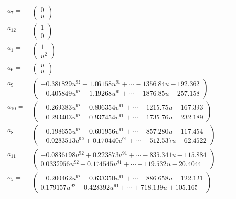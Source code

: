\documentclass[1p]{elsarticle_modified}
\theoremstyle{definition}
\begin{document}
\begin{tabular}{m{7pt} m{180pt} m{7pt} m{180pt} }
\flushright $a_{7}=$&$\begin{pmatrix}0\\u\end{pmatrix}$ \\
\flushright $a_{12}=$&$\begin{pmatrix}1\\0\end{pmatrix}$ \\
\flushright $a_{1}=$&$\begin{pmatrix}1\\u^2\end{pmatrix}$ \\
\flushright $a_{6}=$&$\begin{pmatrix}u\\u\end{pmatrix}$ \\
\flushright $a_{9}=$&$\begin{pmatrix}-0.381829 u^{92}+1.06158 u^{91}+\cdots-1356.84 u-192.362\\-0.405849 u^{92}+1.19268 u^{91}+\cdots-1876.85 u-257.158\end{pmatrix}$ \\
\flushright $a_{10}=$&$\begin{pmatrix}-0.269383 u^{92}+0.806354 u^{91}+\cdots-1215.75 u-167.393\\-0.293403 u^{92}+0.937454 u^{91}+\cdots-1735.76 u-232.189\end{pmatrix}$ \\
\flushright $a_{8}=$&$\begin{pmatrix}-0.198655 u^{92}+0.601956 u^{91}+\cdots-857.280 u-117.454\\-0.0283513 u^{92}+0.170440 u^{91}+\cdots-512.537 u-62.4622\end{pmatrix}$ \\
\flushright $a_{11}=$&$\begin{pmatrix}-0.0836198 u^{92}+0.223873 u^{91}+\cdots-836.341 u-115.884\\0.0332956 u^{92}-0.174545 u^{91}+\cdots-119.532 u-20.4044\end{pmatrix}$ \\
\flushright $a_{5}=$&$\begin{pmatrix}-0.200462 u^{92}+0.633350 u^{91}+\cdots-886.658 u-122.121\\0.179157 u^{92}-0.428392 u^{91}+\cdots+718.139 u+105.165\end{pmatrix}$ \\

\end{tabular}
\end{document}

